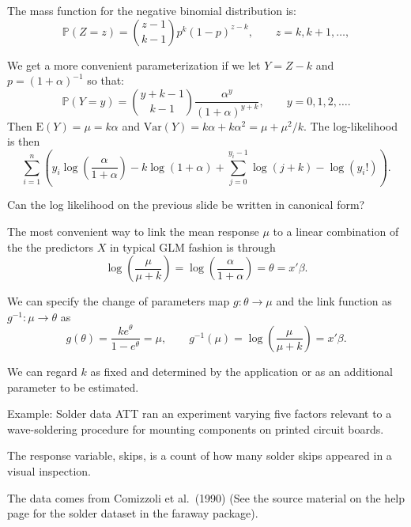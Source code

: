 \documentclass[
  ignorenonframetext,
]{beamer}
\begin{document}
\begin{frame}{}
\protect\hypertarget{section-20}{}
The mass function for the negative binomial distribution is: \[
  \mathbb{P}(Z = z) = {z-1 \choose k-1}p^k(1-p)^{z-k}, \qquad z = k,k+1,\ldots,
\]

\vspace{12pt}

We get a more convenient parameterization if we let \(Y = Z - k\) and
\(p = (1 + \alpha)^{-1}\) so that: \[
  \mathbb{P}(Y=y) = {y+k-1 \choose k-1} \frac{\alpha^y}{(1+\alpha)^{y+k}}, \qquad y = 0,1,2,\ldots.
\] Then \(\mathrm{E}(Y) = \mu = k\alpha\) and
\(\mathrm{Var}(Y) = k\alpha + k\alpha^2 = \mu + \mu^2/k\). The
log-likelihood is then \[
  \sum_{i=1}^n\left(y_i\log\left(\frac{\alpha}{1 + \alpha}\right) - k\log(1 + \alpha) 
    + \sum_{j=0}^{y_i-1}\log(j+k) - \log(y_i!)\right).
\]
\end{frame}

\begin{frame}{}
\protect\hypertarget{section-21}{}
\begin{center}
Can the log likelihood on the previous slide be written in canonical form?
\end{center}
\end{frame}

\begin{frame}{}
\protect\hypertarget{section-22}{}
The most convenient way to link the mean response \(\mu\) to a linear
combination of the the predictors \(X\) in typical GLM fashion is
through \[
  \log\left(\frac{\mu}{\mu+k}\right) = \log\left(\frac{\alpha}{1+\alpha}\right) = \theta = x'\beta.
\]

\vspace{12pt}

We can specify the change of parameters map \(g:\theta\to\mu\) and the
link function as \(g^{-1}:\mu\to\theta\) as \[
  g(\theta) = \frac{ke^\theta}{1 - e^\theta} = \mu, \qquad 
    g^{-1}(\mu) = \log\left(\frac{\mu}{\mu+k}\right) = x'\beta.
\]

\vspace{12pt}

We can regard \(k\) as fixed and determined by the application or as an
additional parameter to be estimated.
\end{frame}

\begin{frame}{Example: Solder data}
\protect\hypertarget{example-solder-data}{}
ATT ran an experiment varying five factors relevant to a wave-soldering
procedure for mounting components on printed circuit boards.

\vspace{12pt}

The response variable, skips, is a count of how many solder skips
appeared in a visual inspection.

\vspace{12pt}

The data comes from Comizzoli et al.~(1990) (See the source material on
the help page for the solder dataset in the faraway package).
\end{frame}
\end{document}
